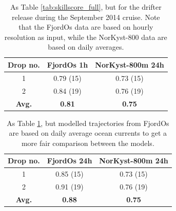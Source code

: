 \begin{table}[htb]
\begin{center}
  \begin{tabular}{ | c | c | c |}
    \hline
    {\bf Drop no.} & {\bf FjordOs 1h} & {\bf NorKyst-800m 24h} \\ \hline
    1 & 0.79 (15) & 0.73 (15) \\ 
    2 & 0.84 (19) & 0.76 (19) \\ \hline
    {\bf Avg.} & {\bf 0.81} & {\bf 0.75} \\
    \hline
  \end{tabular}
\caption{\small As Table \ref{tab:skillscore_full}, but for the drifter release during the September 2014 cruise. Note that the FjordOs data are based on hourly resolution as input, while the NorKyst-800 data are based on daily averages.}
\label{tab:skillscore2014_1h}
\end{center}
\end{table}

\begin{table}[htb]
\begin{center}
  \begin{tabular}{ | c | c | c |}
    \hline
    {\bf Drop no.} & {\bf FjordOs 24h} & {\bf NorKyst-800m 24h} \\ \hline
    1 & 0.85 (15) & 0.73 (15) \\ 
    2 & 0.91 (19) & 0.76 (19) \\ \hline
    {\bf Avg.} & {\bf 0.88} & {\bf 0.75} \\
    \hline
  \end{tabular}
\caption{\small As Table \ref{tab:skillscore2014_1h}, but modelled trajectories from FjordOs are based on daily average ocean currents to get a more fair comparison between the models.}
\label{tab:skillscore2014_24h}
\end{center}
\end{table}

